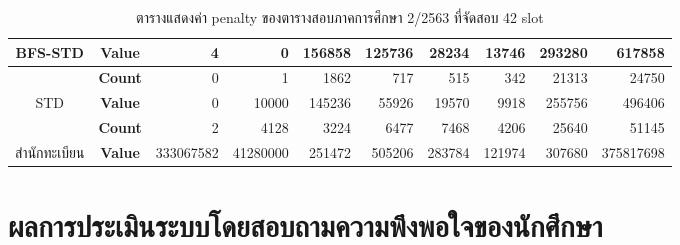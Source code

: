 \begin{table}[]
{\begin{tabular}{@{}ccrrrrrrrr@{}}
    \multirow{-2}{*}{BFS-STD}                    & \textbf{Value}                        & 4                        & 0                        & 156858                        & 125736                       & 28234                        & 13746                        & 293280                        & 617858                        \\ \midrule
                                                 & \textbf{Count}                        & 0                        & 1                        & 1862                          & 717                          & 515                          & 342                          & 21313                         & 24750                         \\ \cmidrule(l){2-10} 
    \multirow{-2}{*}{STD}                        & \textbf{Value}                        & 0                        & 10000                    & 145236                        & 55926                        & 19570                        & 9918                         & 255756                        & 496406                        \\ \midrule
                                                 & \textbf{Count}                        & 2                        & 4128                     & 3224                          & 6477                         & 7468                         & 4206                         & 25640                         & 51145                         \\ \cmidrule(l){2-10} 
    \multirow{-2}{*}{สำนักทะเบียน}               & \textbf{Value}                          & 333067582                 & 41280000                 & 251472                        & 505206                       & 283784                       & 121974                       & 307680                        & 375817698                     \\ \bottomrule
    \end{tabular}%
    }
    \caption{ตารางแสดงค่า penalty ของตารางสอบภาคการศึกษา 2/2563 ที่จัดสอบ 42 slot}
    \label{tab:result_table_263}
\end{table}

\section{ผลการประเมินระบบโดยสอบถามความพึงพอใจของนักศึกษา}
